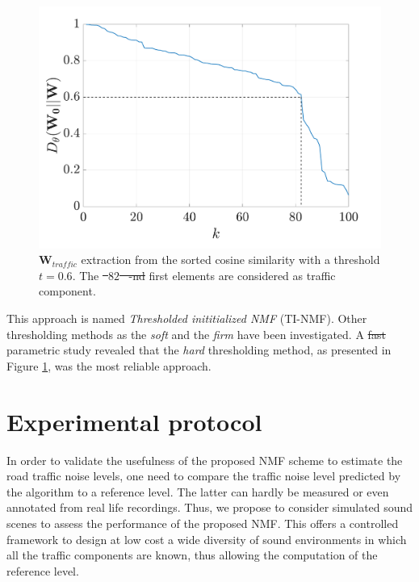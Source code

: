 \documentclass[twocolumn]{svjour3}          %
\providecommand{\DIFaddtex}[1]{{\protect\color{blue}\uwave{#1}}} %
\providecommand{\DIFdeltex}[1]{{\protect\color{red}\sout{#1}}}                      %
\providecommand{\DIFaddbegin}{} %
\providecommand{\DIFaddend}{} %
\providecommand{\DIFdelbegin}{} %
\providecommand{\DIFdelend}{} %
\providecommand{\DIFaddFL}[1]{\DIFadd{#1}} %
\providecommand{\DIFdelFL}[1]{\DIFdel{#1}} %
\providecommand{\DIFaddbeginFL}{} %
\providecommand{\DIFaddendFL}{} %
\providecommand{\DIFdelbeginFL}{} %
\providecommand{\DIFdelendFL}{} %
\providecommand{\DIFadd}[1]{\texorpdfstring{\DIFaddtex{#1}}{#1}} %
\providecommand{\DIFdel}[1]{\texorpdfstring{\DIFdeltex{#1}}{}} %
\begin{document}
\begin{figure}
[t]
\centering
\includegraphics[width=0.8\linewidth]{figures/distanceCosLinDisplay.pdf}
\caption{$\mathbf{W}_{traffic}$ extraction from the sorted cosine similarity with a threshold $t = 0.6$. The \DIFdelbeginFL \DIFdelFL{\mbox{%
$82$
}%
-nd }\DIFdelendFL first \DIFaddbeginFL \DIFaddFL{\mbox{%
$82$
}%
}\DIFaddendFL elements are considered as traffic component.}
\label{fig:W_TI_NMF}
\end{figure}
This approach is named \textit{Thresholded inititialized NMF} (TI-NMF). Other thresholding methods as the \textit{soft} \cite{donoho1995noising} and the \textit{firm} \cite{fornasier2008iterative} have been investigated. A \DIFdelbegin \DIFdel{fast }\DIFdelend \DIFaddbegin \DIFadd{quick }\DIFaddend parametric study revealed that the \textit{hard} thresholding method, as presented in  Figure \ref{fig:W_TI_NMF}, was the most reliable approach.

\section{Experimental protocol}\label{part:protocol}

In order to validate the usefulness of the proposed NMF scheme to estimate the road traffic noise levels, one need to compare the traffic noise level predicted by the algorithm to a reference level. The latter can hardly be measured or even annotated from real life recordings. Thus,  we propose to consider simulated sound scenes to assess the performance of the proposed NMF. This offers a controlled framework to design at low cost a wide diversity of sound environments in which all the traffic components are known, thus allowing the computation of the reference level.
\end{document}

